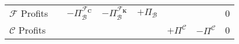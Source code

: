\documentclass[a4paper, headings=standardclasses]{scrartcl}
\begin{document}
{\begin{tabularx}{\textwidth}{@{} Y|cccccc|l @{}}
        \midrule
        $\mathcal{F}$ Profits  &                                          & $-\Pi^{\mathcal{F}_{\mathbf{C}}}_\mathcal{B}$              & $-\Pi^{\mathcal{F}_{\mathbf{K}}}_\mathcal{B}$                          & $+\Pi_\mathcal{B}$                     &                                          &                                        & 0                                 \\
        $\mathcal{C}$ Profits  &                                          &                                                            &                                                                        &                                        & $+\Pi^\mathcal{C}$                       & $-\Pi^\mathcal{C}$                     & 0                                 \\



\end{tabularx}}
\end{document}
